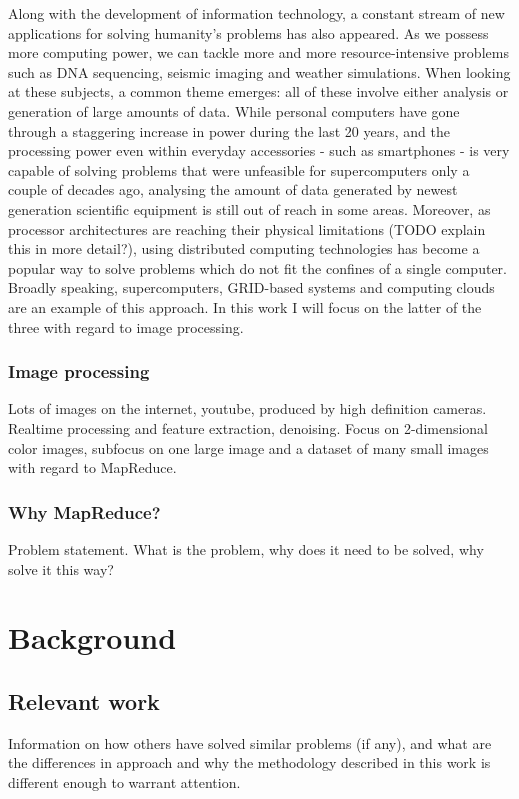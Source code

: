 \documentclass [12pt,a4paper]{report}
\begin{document}
Along with the development of information technology, a constant stream of new applications for solving humanity's problems has also appeared. As we possess more computing power, we can tackle more and more resource-intensive problems such as DNA sequencing, seismic imaging and weather simulations. When looking at these subjects, a common theme emerges: all of these involve either analysis or generation of large amounts of data. While personal computers have gone through a staggering increase in power during the last 20 years, and the processing power even within everyday accessories - such as smartphones - is very capable of solving problems that were unfeasible for supercomputers only a couple of decades ago, analysing the amount of data generated by newest generation scientific equipment is still out of reach in some areas. Moreover, as processor architectures are reaching their physical limitations (TODO explain this in more detail?), using distributed computing technologies has become a popular way to solve problems which do not fit the confines of a single computer. Broadly speaking, supercomputers, GRID-based systems and computing clouds are an example of this approach. In this work I will focus on the latter of the three with regard to image processing.

\subsection{Image processing}

Lots of images on the internet, youtube, produced by high definition cameras. Realtime processing and feature extraction, denoising. Focus on 2-dimensional color images, subfocus on one large image and a dataset of many small images with regard to MapReduce.

\subsection{Why MapReduce?}

Problem statement. What is the problem, why does it need to be solved, why solve it this way?

\chapter{Background}

\section{Relevant work}
Information on how others have solved similar problems (if any), and what are the differences in approach and why the methodology described in this work is different enough to warrant attention.
\end{document}
